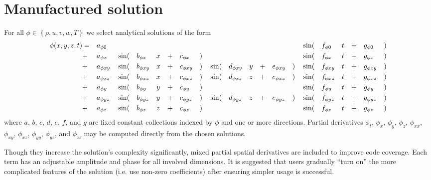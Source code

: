 \documentclass[10pt,reqno]{amsart}
\begin{document}
\section{Manufactured solution}

For all $\phi\in\left\{\rho, u, v, w, T\right\}$ we select analytical solutions
of the form
\begin{alignat}{20}
\label{eq:solution}
  \phi\!\left(x, y, z, t\right)
&= &&a_{\phi{}0}  &&     &&             &&  &&  &&            &&  &&     &&             &&  &&  &&            &&   &&\sin(&&f_{\phi{}0 } &&t &&+ &&g_{\phi{}0 }&&)       \\
&+ &&a_{\phi{}x } &&\sin(&&b_{\phi{}x } &&x &&+ &&c_{\phi{}x }&&) &&     &&             &&  &&  &&            &&   &&\sin(&&f_{\phi{}x } &&t &&+ &&g_{\phi{}x }&&) \notag\\
&+ &&a_{\phi{}xy} &&\sin(&&b_{\phi{}xy} &&x &&+ &&c_{\phi{}xy}&&) &&\sin(&&d_{\phi{}xy} &&y &&+ &&e_{\phi{}xy}&&)  &&\sin(&&f_{\phi{}xy} &&t &&+ &&g_{\phi{}xy}&&) \notag\\
&+ &&a_{\phi{}xz} &&\sin(&&b_{\phi{}xz} &&x &&+ &&c_{\phi{}xz}&&) &&\sin(&&d_{\phi{}xz} &&z &&+ &&e_{\phi{}xz}&&)  &&\sin(&&f_{\phi{}xz} &&t &&+ &&g_{\phi{}xz}&&) \notag\\
&+ &&a_{\phi{}y } &&\sin(&&b_{\phi{}y } &&y &&+ &&c_{\phi{}y }&&) &&     &&             &&  &&  &&            &&   &&\sin(&&f_{\phi{}y } &&t &&+ &&g_{\phi{}y }&&) \notag\\
&+ &&a_{\phi{}yz} &&\sin(&&b_{\phi{}yz} &&y &&+ &&c_{\phi{}yz}&&) &&\sin(&&d_{\phi{}yz} &&z &&+ &&e_{\phi{}yz}&&)  &&\sin(&&f_{\phi{}yz} &&t &&+ &&g_{\phi{}yz}&&) \notag\\
&+ &&a_{\phi{}z } &&\sin(&&b_{\phi{}z } &&z &&+ &&c_{\phi{}z }&&) &&     &&             &&  &&  &&            &&   &&\sin(&&f_{\phi{}z } &&t &&+ &&g_{\phi{}z }&&) \notag
\end{alignat}
where $a$, $b$, $c$, $d$, $e$, $f$, and $g$ are fixed constant collections
indexed by $\phi$ and one or more directions.  Partial derivatives $\phi_{t }$,
$\phi_{x }$, $\phi_{y }$, $\phi_{z }$, $\phi_{xx}$, $\phi_{xy}$, $\phi_{xz}$,
$\phi_{yy}$, $\phi_{yz}$, and $\phi_{zz}$ may be computed directly from the
chosen solutions.

Though they increase the solution's complexity significantly, mixed partial
spatial derivatives are included to improve code coverage.  Each term has an
adjustable amplitude and phase for all involved dimensions.  It is suggested
that users gradually ``turn on'' the more complicated features of the solution
(i.e. use non-zero coefficients) after ensuring simpler usage is successful.
\end{document}
